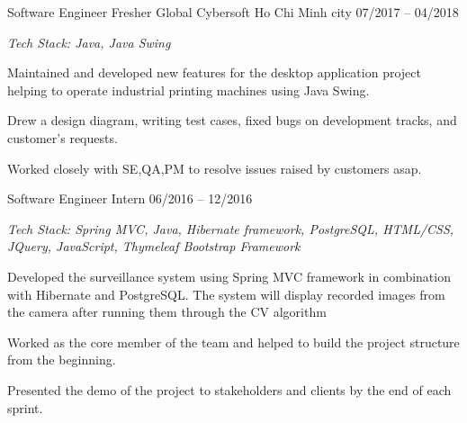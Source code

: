 \begin{cventries}
  \cventry
    {Software Engineer Fresher} %
    {Global Cybersoft} %
    {Ho Chi Minh city} %
    {07/2017 -- 04/2018} %
    {
      \begin{cvitems} %
        \item[] {\it Tech Stack: Java, Java Swing}
        \item {Maintained and developed new features for the desktop application project helping to operate industrial printing machines using Java Swing.}
        \item {Drew a design diagram, writing test cases, fixed bugs on development tracks, and customer’s requests.}
        \item{Worked closely with SE,QA,PM to resolve issues raised by customers asap.}
      \end{cvitems}
    }

    \cventry
    {Software Engineer Intern} %
    {} %
    {} %
    {06/2016 -- 12/2016} %
    {
      \begin{cvitems} %
        \item[] {\it Tech Stack: Spring MVC, Java, Hibernate framework, PostgreSQL, HTML/CSS, JQuery, JavaScript, Thymeleaf Bootstrap Framework}
        \item {Developed the surveillance system using Spring MVC framework in combination with Hibernate and PostgreSQL. The system will display recorded images from the camera after running them through the CV algorithm}
        \item {Worked as the core member of the team and helped to build the project structure from the beginning.}
        \item{Presented the demo of the project to stakeholders and clients by the end of each sprint.}
      \end{cvitems}
    }

\end{cventries}

